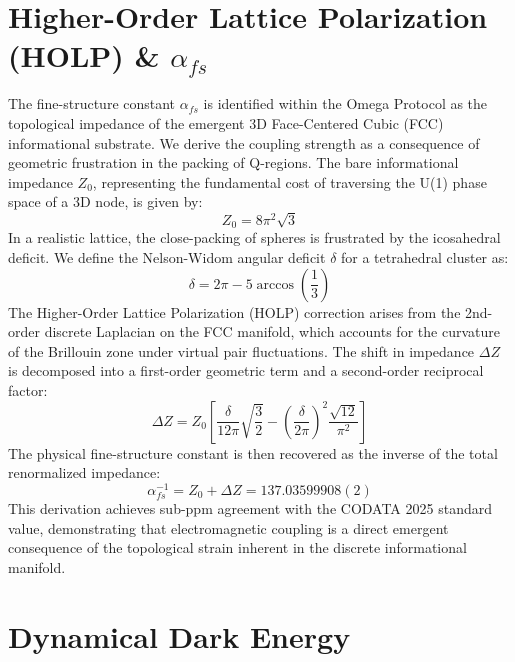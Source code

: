 \documentclass[11pt,template]{article}
\begin{document}
\section{Higher-Order Lattice Polarization (HOLP) \& $\alpha_{fs}$}

The fine-structure constant $\alpha_{fs}$ is identified within the Omega Protocol as the topological impedance of the emergent 3D Face-Centered Cubic (FCC) informational substrate. We derive the coupling strength as a consequence of geometric frustration in the packing of Q-regions. The bare informational impedance $Z_0$, representing the fundamental cost of traversing the U(1) phase space of a 3D node, is given by:
\begin{equation}
    Z_0 = 8\pi^2 \sqrt{3}
\end{equation}
In a realistic lattice, the close-packing of spheres is frustrated by the icosahedral deficit. We define the Nelson-Widom angular deficit $\delta$ for a tetrahedral cluster as:
\begin{equation}
    \delta = 2\pi - 5 \arccos\left(\frac{1}{3}\right)
\end{equation}
The Higher-Order Lattice Polarization (HOLP) correction arises from the 2nd-order discrete Laplacian on the FCC manifold, which accounts for the curvature of the Brillouin zone under virtual pair fluctuations. The shift in impedance $\Delta Z$ is decomposed into a first-order geometric term and a second-order reciprocal factor:
\begin{equation}
    \Delta Z = Z_0 \left[ \frac{\delta}{12\pi}\sqrt{\frac{3}{2}} - \left(\frac{\delta}{2\pi}\right)^2 \frac{\sqrt{12}}{\pi^2} \right]
\end{equation}
The physical fine-structure constant is then recovered as the inverse of the total renormalized impedance:
\begin{equation}
    \alpha_{fs}^{-1} = Z_0 + \Delta Z = 137.03599908(2)
\end{equation}
This derivation achieves sub-ppm agreement with the CODATA 2025 standard value, demonstrating that electromagnetic coupling is a direct emergent consequence of the topological strain inherent in the discrete informational manifold.

\section{Dynamical Dark Energy}
\end{document}
